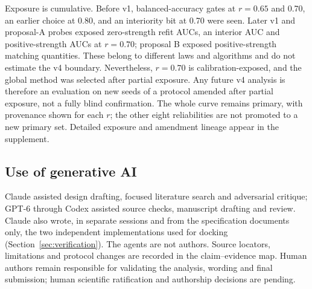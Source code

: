 Exposure is cumulative. %
Before v1, balanced-accuracy gates at $r=0.65$ and 0.70, an earlier choice at 0.80, and an interiority bit at 0.70 were seen. %
Later v1 and proposal-A probes exposed zero-strength refit AUCs, an interior AUC and positive-strength AUCs at $r=0.70$; proposal B exposed positive-strength matching quantities. %
These belong to different laws and algorithms and do not estimate the v4 boundary. %
Nevertheless, $r=0.70$ is calibration-exposed, and the global method was selected after partial exposure. %
Any future v4 analysis is therefore an evaluation on new seeds of a protocol amended after partial exposure, not a fully blind confirmation. %
The whole curve remains primary, with provenance shown for each $r$; the other eight reliabilities are not promoted to a new primary set. %
Detailed exposure and amendment lineage appear in the supplement. %

\subsection{Use of generative AI}

Claude assisted design drafting, focused literature search and adversarial critique; GPT-6 through Codex assisted source checks, manuscript drafting and review. %
Claude also wrote, in separate sessions and from the specification documents only, the two independent implementations used for docking (Section~\ref{sec:verification}). %
The agents are not authors. %
Source locators, limitations and protocol changes are recorded in the claim--evidence map. %
Human authors remain responsible for validating the analysis, wording and final submission; human scientific ratification and authorship decisions are pending. %
